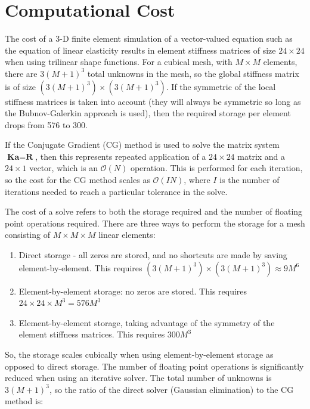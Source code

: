 \documentclass[10pt]{article}
\begin{document}
\section{Computational Cost}

The cost of a 3-D finite element simulation of a vector-valued equation such as the equation of linear elasticity results in element stiffness matrices of size \(24\times24\) when using trilinear shape functions. For a cubical mesh, with \(M\times M\) elements, there are \(3(M+1)^3\) total unknowns in the mesh, so the global stiffness matrix is of size \((3(M+1)^3)\times(3(M+1)^3)\). If the symmetric of the local stiffness matrices is taken into account (they will always be symmetric so long as the Bubnov-Galerkin approach is used), then the required storage per element drops from 576 to 300. 

If the Conjugate Gradient (CG) method is used to solve the matrix system \(\textbf{K}\textbf{a}=\textbf{R}\), then this represents repeated application of a \(24\times24\) matrix and a \(24\times1\) vector, which is an \(\mathscr{O}(N)\) operation. This is performed for each iteration, so the cost for the CG method scales as \(\mathscr{O}(IN)\), where \(I\) is the number of iterations needed to reach a particular tolerance in the solve.

The cost of a solve refers to both the storage required and the number of floating point operations required. There are three ways to perform the storage for a mesh consisting of \(M\times M\times M\) linear elements:

\begin{enumerate}
\item Direct storage - all zeros are stored, and no shortcuts are made by saving element-by-element. This requires \((3(M+1)^3)\times(3(M+1)^3)\approx9M^6\)
\item Element-by-element storage: no zeros are stored. This requires \(24\times24\times M^3=576M^3\)
\item Element-by-element storage, taking advantage of the symmetry of the element stiffness matrices. This requires \(300M^3\)
\end{enumerate} 

So, the storage scales cubically when using element-by-element storage as opposed to direct storage. The number of floating point operations is significantly reduced when using an iterative solver. The total number of unknowns is \(3(M+1)^3\), so the ratio of the direct solver (Gaussian elimination) to the CG method is:
\end{document}
